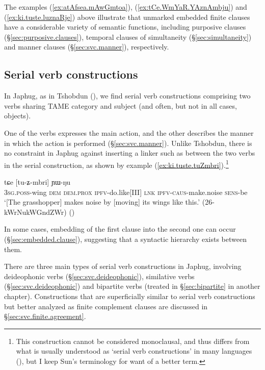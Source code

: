 The examples (\ref{ex:atAfsea.mAwGmtoa}), (\ref{ex:tCe.WmYaR.YAznAmbju}) and (\ref{ex:ki.tuste.luznaRje}) above illustrate that unmarked embedded finite clauses have a considerable variety of semantic functions, including purposive clauses (§\ref{sec:purposive.clauses}), temporal clauses of simultaneity (§\ref{sec:simultaneity}) and manner clauses (§\ref{sec:svc.manner}), respectively.


\subsection{Serial verb constructions} \label{sec:svc}
In Japhug, as in Tshobdun (\citealt[490--491]{sun12complementation}), we find serial verb constructions comprising two verbs sharing TAME category and subject (and often, but not in all cases, objects). 
 
One of the verbs expresses the main action, and the other describes the manner in which the action is performed (§\ref{sec:svc.manner}). Unlike Tshobdun, there is no constraint in Japhug against inserting a linker such as  between the two verbs in the serial construction, as shown by example (\ref{ex:ki.tuste.tuZmbri}).\footnote{This construction cannot be considered monoclausal, and thus differs from what is usually understood as `serial verb constructions' in many languages (\citealt[6]{aikhenvald06svc}), but I keep Sun's terminology for want of a better term. }

\begin{exe}
\ex \label{ex:ki.tuste.tuZmbri}
 tɕe [tu-ʑ-mbri] ɲɯ-ŋu \\
\textsc{3sg}.\textsc{poss}-wing \textsc{dem} \textsc{dem}.\textsc{prox} \textsc{ipfv}-do.like[III] \textsc{lnk} \textsc{ipfv}-\textsc{caus}-make.noise \textsc{sens}-be \\
\glt `[The grasshopper] makes noise by [moving] its wings like this.' (26-kWrNukWGndZWr)
()
\end{exe}

In some cases, embedding of the first clause into the second one can occur (§\ref{sec:embedded.clause}), suggesting that a syntactic hierarchy exists between them.

There are three main types of serial verb constructions in Japhug, involving deideophonic verbs (§\ref{sec:svc.deideophonic}), similative verbs (§\ref{sec:svc.deideophonic}) and bipartite verbs (treated in §\ref{sec:bipartite} in another chapter). Constructions that are superficially similar to serial verb constructions but better analyzed as finite complement clauses are discussed in §\ref{sec:svc.finite.agreement}.


